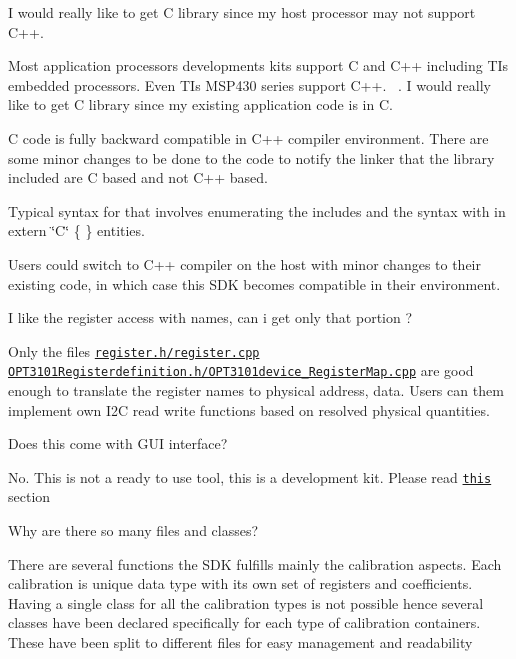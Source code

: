 \begin{DoxyEnumerate}
\begin{DoxyItemize}
\end{DoxyItemize}
\item I would really like to get C library since my host processor may not support C++.
\begin{DoxyItemize}
\item Most application processors developments kits support C and C++ including TI\textquotesingle{}s embedded processors. Even TI\textquotesingle{}s M\+S\+P430 series support C++. ~. I would really like to get C library since my existing application code is in C.
\item C code is fully backward compatible in C++ compiler environment. There are some minor changes to be done to the code to notify the linker that the library included are C based and not C++ based.
\item Typical syntax for that involves enumerating the includes and the syntax with in extern \char`\"{}\+C\char`\"{} \{ \} entities.
\item Users could switch to C++ compiler on the host with minor changes to their existing code, in which case this S\+DK becomes compatible in their environment.
\end{DoxyItemize}
\item I like the register access with names, can i get only that portion ?
\begin{DoxyItemize}
\item Only the files \href{class_o_p_t3101_1_1registers.html}{\tt register.\+h/register.cpp} \href{class_o_p_t3101_1_1registers.html}{\tt O\+P\+T3101\+Registerdefinition.\+h/\+O\+P\+T3101device\+\_\+\+Register\+Map.cpp} are good enough to translate the register names to physical address, data. Users can them implement own I2C read write functions based on resolved physical quantities.
\end{DoxyItemize}
\item Does this come with G\+UI interface?
\begin{DoxyItemize}
\item No. This is not a ready to use tool, this is a development kit. Please read \href{#Limitations}{\tt this} section
\end{DoxyItemize}
\item Why are there so many files and classes?
\begin{DoxyItemize}
\item There are several functions the S\+DK fulfills mainly the calibration aspects. Each calibration is unique data type with its own set of registers and coefficients. Having a single class for all the calibration types is not possible hence several classes have been declared specifically for each type of calibration containers. These have been split to different files for easy management and readability

\end{DoxyItemize}
\end{DoxyEnumerate}

